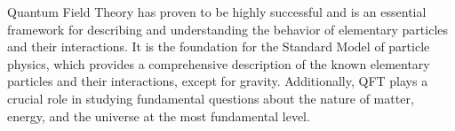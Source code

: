 Quantum Field Theory has proven to be highly successful and is an essential framework for describing and understanding the behavior of elementary particles and their interactions. It is the foundation for the Standard Model of particle physics, which provides a comprehensive description of the known elementary particles and their interactions, except for gravity. Additionally, QFT plays a crucial role in studying fundamental questions about the nature of matter, energy, and the universe at the most fundamental level.